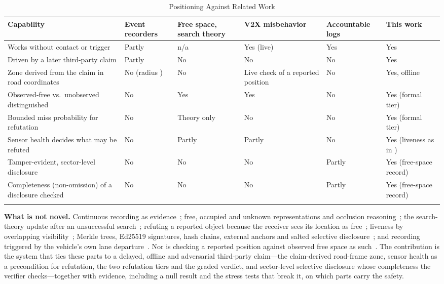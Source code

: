 \begin{table}[!t]
\centering
\footnotesize
\caption{Positioning Against Related Work}
\label{tab:positioning}
\renewcommand{\arraystretch}{1.15}
\begin{tabular}{>{\raggedright\arraybackslash}p{4.4cm}>{\raggedright\arraybackslash}p{2.4cm}>{\raggedright\arraybackslash}p{2.6cm}>{\raggedright\arraybackslash}p{2.1cm}>{\raggedright\arraybackslash}p{2.1cm}>{\raggedright\arraybackslash}p{2.0cm}}
\toprule
\textbf{Capability} & \textbf{Event recorders \cite{b7,b8,b9,b10,b12,b14,b15,b16,b17,b18}} & \textbf{Free space, search theory \cite{b19,b20,b22,b23,b30,b31,b32}} & \textbf{V2X misbehavior \cite{b24,b25,b26,b27,b28,b29}} & \textbf{Accountable logs \cite{b34,b35,b36,b37,b38,b39,b40,b41}} & \textbf{This work} \\
\midrule
Works without contact or trigger & Partly \cite{b17,b18} & n/a & Yes (live) & Yes & Yes \\
Driven by a later third-party claim & Partly \cite{b15,b16} & No & No & No & Yes \\
Zone derived from the claim in road coordinates & No (radius \cite{b15}) & No & Live check of a reported position & No & Yes, offline \\
Observed-free vs.\ unobserved distinguished & No & Yes & Yes \cite{b28} & No & Yes (formal tier) \\
Bounded miss probability for refutation & No & Theory only \cite{b30} & No & No & Yes (formal tier) \\
Sensor health decides what may be refuted & No & Partly & Partly \cite{b26} & No & Yes (liveness as in \cite{b33}) \\
Tamper-evident, sector-level disclosure & No & No & No & Partly \cite{b39,b40,b41} & Yes (free-space record) \\
Completeness (non-omission) of a disclosure checked & No & No & No & Partly \cite{b36,b62} & Yes (free-space record) \\
\bottomrule
\multicolumn{6}{l}{\scriptsize n/a: not applicable.}
\end{tabular}
\end{table}

\textbf{What is not novel.} Continuous recording as evidence~\cite{b9}; free, occupied and unknown representations and occlusion reasoning~\cite{b19,b20,b22,b23}; the search-theory update after an unsuccessful search~\cite{b30}; refuting a reported object because the receiver sees its location as free~\cite{b24,b25}; liveness by overlapping visibility~\cite{b33}; Merkle trees, Ed25519 signatures, hash chains, external anchors and salted selective disclosure~\cite{b39,b40,b41,b42,b43,b44}; and recording triggered by the vehicle's own lane departure~\cite{b17}. Nor is checking a reported position against observed free space as such~\cite{b24,b25,b28}. The contribution is the system that ties these parts to a delayed, offline and adversarial third-party claim---the claim-derived road-frame zone, sensor health as a precondition for refutation, the two refutation tiers and the graded verdict, and sector-level selective disclosure whose completeness the verifier checks---together with evidence, including a null result and the stress tests that break it, on which parts carry the safety.

